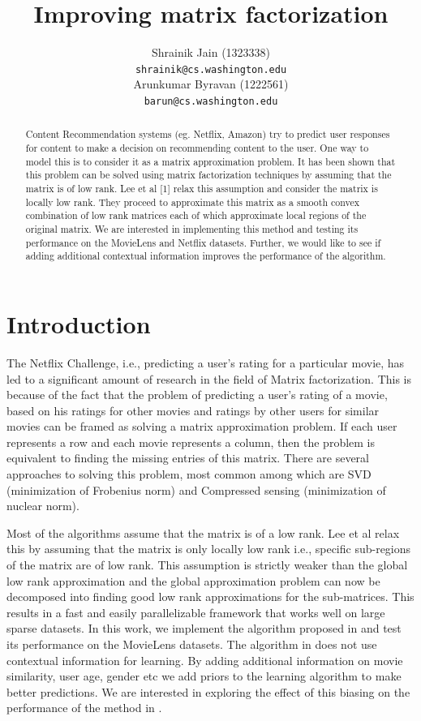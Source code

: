\documentclass[10 pt,table]{article}  %
\title{Improving matrix factorization}
\author{
Shrainik Jain (1323338)\\
\texttt{shrainik@cs.washington.edu} \\
\And
Arunkumar Byravan (1222561) \\
\texttt{barun@cs.washington.edu} \\
}
\begin{document}
\maketitle

\begin{abstract}
Content Recommendation systems (eg. Netflix, Amazon) try to predict user responses for content to make a decision on recommending content to the user. One way to model this is to consider it as a matrix approximation problem. It has been shown that this problem can be solved using matrix factorization techniques by assuming that the matrix is of low rank. Lee et al [1] relax this assumption and consider the matrix is locally low rank. They proceed to approximate this matrix as a smooth convex combination of low rank matrices each of which approximate local regions of the original matrix. We are interested in implementing this method and testing its performance on the MovieLens and Netflix datasets. Further, we would like to see if adding additional contextual information improves the performance of the algorithm. 
\end{abstract}

\section{Introduction}
The Netflix Challenge, i.e., predicting a user's rating for a particular movie, has led to a significant amount of research in the field of Matrix factorization. This is because of the fact that the problem of predicting a user's rating of a movie, based on his ratings for other movies and ratings by other users for similar movies can be framed as solving a matrix approximation problem. If each user represents a row and each movie represents a column, then the problem is equivalent to finding the missing entries of this matrix. There are several approaches to solving this problem, most common among which are SVD \cite{paterek2007improving} (minimization of Frobenius norm) and Compressed sensing (minimization of nuclear norm). 

Most of the algorithms assume that the matrix is of a low rank. Lee et al \cite{lee2013local} relax this by assuming that the matrix is only locally low rank i.e., specific sub-regions of the matrix are of low rank. This assumption is strictly weaker than the global low rank approximation and the global approximation problem can now be decomposed into finding good low rank approximations for the sub-matrices. This results in a fast and easily parallelizable framework that works well on large sparse datasets. In this work, we implement the algorithm proposed in \cite{lee2013local} and test its performance on the MovieLens datasets. The algorithm in \cite{lee2013local} does not use contextual information for learning. By adding additional information on movie similarity, user age, gender etc we add priors to the learning algorithm to make better predictions. We are interested in exploring the effect of this biasing on the performance of the method in \cite{lee2013local}.
\end{document}
